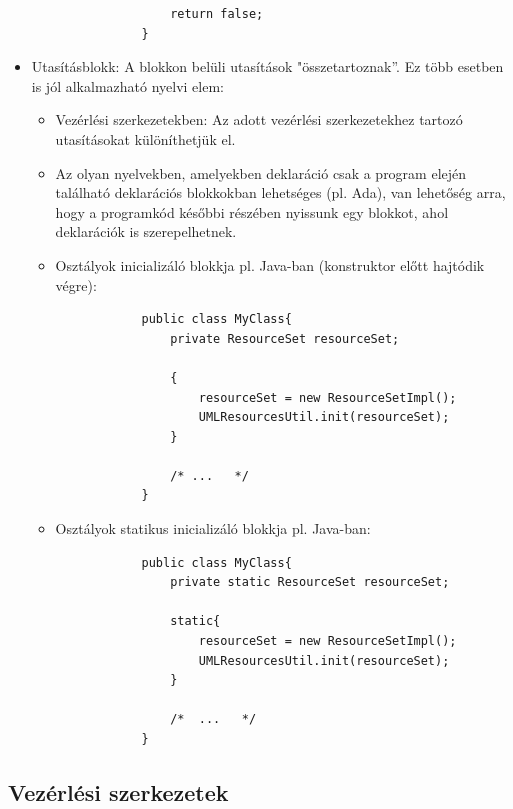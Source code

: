 \documentclass[margin=0px]{article}
\begin{document}
\begin{itemize}
\begin{itemize}
\begin{verbatim}
			    return false;
			}
			\end{verbatim}
		\end{itemize}
		
		\item	Utasításblokk: A blokkon belüli utasítások "összetartoznak”.
		Ez több esetben is jól alkalmazható nyelvi elem:
		\begin{itemize}
			\item	Vezérlési szerkezetekben: Az adott vezérlési szerkezetekhez tartozó utasításokat különíthetjük el.

			\item	Az olyan nyelvekben, amelyekben deklaráció csak a program elején található deklarációs
			blokkokban lehetséges (pl. Ada), van lehetőség arra, hogy a programkód későbbi részében nyissunk
			egy blokkot, ahol deklarációk is szerepelhetnek.
			
			\item	Osztályok inicializáló blokkja pl. Java-ban (konstruktor előtt hajtódik végre):
			\begin{verbatim}
			public class MyClass{
			    private ResourceSet resourceSet;
			
			    {
			        resourceSet = new ResourceSetImpl();
			        UMLResourcesUtil.init(resourceSet);
			    }
			    
			    /* ...   */
			}
			\end{verbatim}
			\item	Osztályok statikus inicializáló blokkja pl. Java-ban:
			\begin{verbatim}
			public class MyClass{
			    private static ResourceSet resourceSet;
			    
			    static{
			        resourceSet = new ResourceSetImpl();
			        UMLResourcesUtil.init(resourceSet);
			    }
			    
			    /*  ...   */
			}
			\end{verbatim}
				
		\end{itemize}
	
	\end{itemize}

	\subsection{Vezérlési szerkezetek}
	
\end{document}
